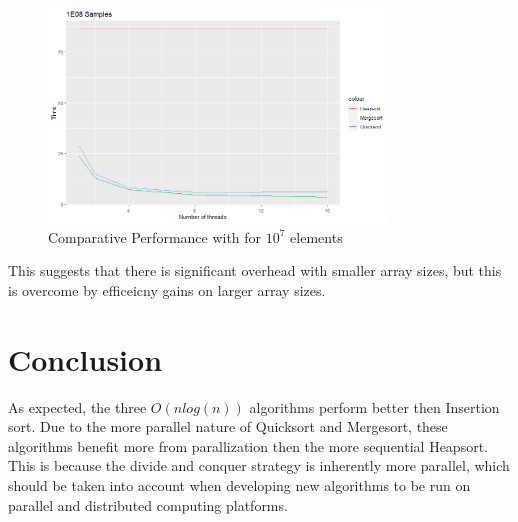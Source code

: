 \documentclass[conference]{IEEEtran}
\begin{document}
    \begin{figure}
        \includegraphics[width=9cm]{1e8.png} 
        \caption{Comparative Performance with for $10^7$ elements}
        \label{1e8}
    \end{figure}
    
    This suggests that there is significant overhead with smaller array sizes, but this is overcome by efficeicny gains on larger array sizes. 
    \section{Conclusion}
    As expected, the three $O(n log(n))$ algorithms perform better then Insertion sort. 
    Due to the more parallel nature of Quicksort and Mergesort, these algorithms benefit more from parallization then the more sequential Heapsort. 
    This is because the divide and conquer strategy is inherently more parallel, which should be taken into account when developing new algorithms to be run on parallel and distributed computing platforms. 
    
    
    \appendix
\end{document}
